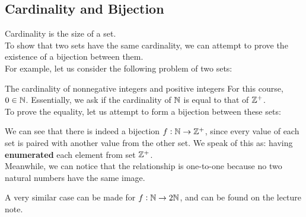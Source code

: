 \subsection{Cardinality and Bijection}
Cardinality is the size of a set. \\
To show that two sets have the same cardinality, we can attempt to prove the existence of a bijection between them. \\
For example, let us consider the following problem of two sets:
\begin{ln-quest}{The cardinality of nonnegative integers and positive integers}{}
    For this course, $0 \in \mathbb{N}$. Essentially, we ask if the cardinality of $\mathbb{N}$ is equal to that of $\mathbb{Z}^+$. \\
    To prove the equality, let us attempt to form a bijection between these sets:
    \begin{center}
    \end{center}
    We can see that there is indeed a bijection $f: \mathbb{N} \rightarrow \mathbb{Z}^+$, since every value of each set is paired with another value from the other set. We speak of this as: having \textbf{enumerated} each element from set $\mathbb{Z}^+$.\\
    Meanwhile, we can notice that the relationship is one-to-one because no two natural numbers have the same image.
\end{ln-quest}
A very similar case can be made for $f: \mathbb{N} \rightarrow 2\mathbb{N}$, and can be found on the lecture note.

